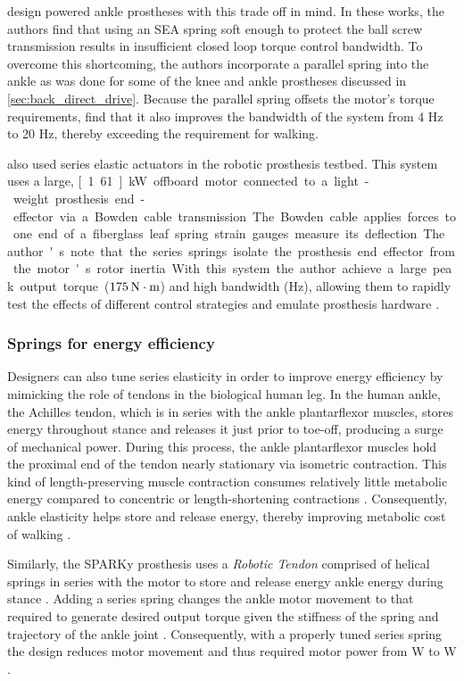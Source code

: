 \citet{au2007biomechanical, au2008powered} design powered ankle prostheses with
this trade off in mind. In these works, the authors find that using an SEA
spring soft enough to protect the ball screw transmission results in
insufficient closed loop torque control bandwidth. To overcome this shortcoming,
the authors incorporate a parallel spring into the ankle as was done for some of
the knee and ankle prostheses discussed in \cref{sec:back_direct_drive}. Because the
parallel spring offsets the motor's torque requirements,
\citeauthor{au2008powered} find that it also improves the bandwidth of the
system from 4 Hz to 20 Hz, thereby exceeding the requirement for walking. 

\citet{caputo2013experimental} also used series elastic actuators in the robotic
prosthesis testbed. This system uses a large, \unit[1.61]{kW} offboard motor
connected to a light-weight prosthesis end-effector via a Bowden cable
transmission. The Bowden cable applies forces to one end of a fiberglass leaf
spring strain gauges measure its deflection. The author's note that the series 
springs isolate the prosthesis end effector from the motor's rotor inertia. With
this system the author achieve a large peak output torque ($\unit[175]{N \cdot m}$)
and high bandwidth (\unit[17]{Hz}), allowing them to rapidly test the effects of
different control strategies and emulate prosthesis hardware
\citep{caputo2015informing}.

\subsubsection{Springs for energy efficiency}
Designers can also tune series elasticity in order to improve energy efficiency
by mimicking the role of tendons in the biological human leg. In the human
ankle, the Achilles tendon, which is in series with the ankle plantarflexor
muscles, stores energy throughout stance and releases it just prior to toe-off,
producing a surge of mechanical power. During this process, the ankle
plantarflexor muscles hold the proximal end of the tendon nearly stationary via
isometric contraction. This kind of length-preserving muscle contraction
consumes relatively little metabolic energy compared to concentric or
length-shortening contractions \citep{rall1984energetic}. Consequently, ankle
elasticity helps store and release energy, thereby improving metabolic cost of
walking \citep{sawicki2009pays}.

Similarly, the SPARKy prosthesis uses a \emph{Robotic Tendon} comprised of
helical springs in series with the motor to store and release energy ankle
energy during stance \citep{hitt2007sparky, bellman2008sparky,
holgate2008sparky}. Adding a series spring changes the ankle motor movement to
that required to generate desired output torque given the stiffness of the
spring and trajectory of the ankle joint . Consequently, with a properly tuned series spring the
design reduces motor movement and thus required motor power from \unit[250]{W}
to \unit[77]{W} \citep{hitt2007sparky}.

